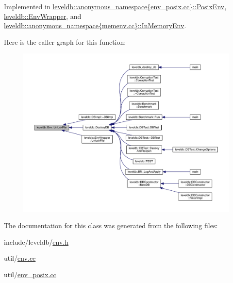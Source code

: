 Implemented in \hyperlink{classleveldb_1_1anonymous__namespace_02env__posix_8cc_03_1_1_posix_env_a88a87e5b79db50c5d2d0dedd2b37f088}{leveldb\+::anonymous\+\_\+namespace\{env\+\_\+posix.\+cc\}\+::\+Posix\+Env}, \hyperlink{classleveldb_1_1_env_wrapper_ab1779dda39167eaa38e660bcc69988c4}{leveldb\+::\+Env\+Wrapper}, and \hyperlink{classleveldb_1_1anonymous__namespace_02memenv_8cc_03_1_1_in_memory_env_a21674a1916bdbfc999ccf26fbf43574e}{leveldb\+::anonymous\+\_\+namespace\{memenv.\+cc\}\+::\+In\+Memory\+Env}.



Here is the caller graph for this function\+:
\nopagebreak
\begin{figure}[H]
\begin{center}
\leavevmode
\includegraphics[width=350pt]{classleveldb_1_1_env_a194a2ee3c21bc0b204ad0e5bc3b81d4b_icgraph}
\end{center}
\end{figure}




The documentation for this class was generated from the following files\+:\begin{DoxyCompactItemize}
\item 
include/leveldb/\hyperlink{env_8h}{env.\+h}\item 
util/\hyperlink{env_8cc}{env.\+cc}\item 
util/\hyperlink{env__posix_8cc}{env\+\_\+posix.\+cc}\end{DoxyCompactItemize}

